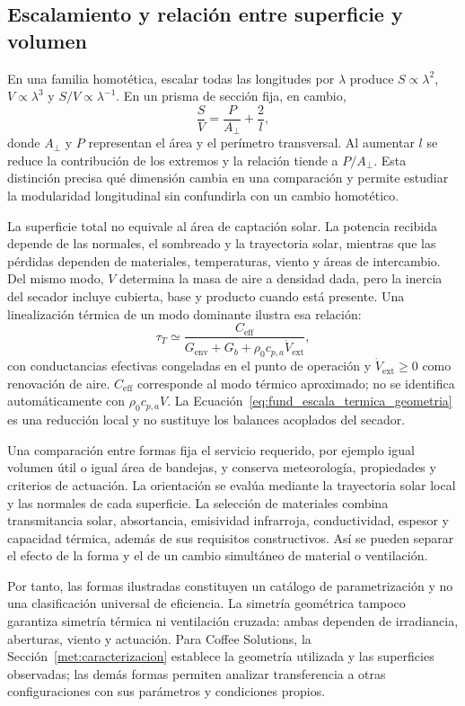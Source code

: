 \subsection{Escalamiento y relación entre superficie y volumen}
\label{subsec:geometria_escalamiento}

En una familia homotética, escalar todas las longitudes por $\lambda$ produce $S\propto\lambda^2$, $V\propto\lambda^3$ y $S/V\propto\lambda^{-1}$. En un prisma de sección fija, en cambio,
\begin{equation}
\frac{S}{V}=\frac{P}{A_{\perp}}+\frac{2}{l},
\label{eq:fund_relacion_superficie_volumen}
\end{equation}
donde $A_{\perp}$ y $P$ representan el área y el perímetro transversal. Al aumentar $l$ se reduce la contribución de los extremos y la relación tiende a $P/A_{\perp}$. Esta distinción precisa qué dimensión cambia en una comparación y permite estudiar la modularidad longitudinal sin confundirla con un cambio homotético.

La superficie total no equivale al área de captación solar. La potencia recibida depende de las normales, el sombreado y la trayectoria solar, mientras que las pérdidas dependen de materiales, temperaturas, viento y áreas de intercambio. Del mismo modo, $V$ determina la masa de aire a densidad dada, pero la inercia del secador incluye cubierta, base y producto cuando está presente. Una linealización térmica de un modo dominante ilustra esa relación:
\begin{equation}
\tau_T\simeq\frac{C_{\mathrm{eff}}}
{G_{\mathrm{env}}+G_b+\rho_0c_{p,a}\dot V_{\mathrm{ext}}},
\label{eq:fund_escala_termica_geometria}
\end{equation}
con conductancias efectivas congeladas en el punto de operación y $\dot V_{\mathrm{ext}}\geq0$ como renovación de aire. $C_{\mathrm{eff}}$ corresponde al modo térmico aproximado; no se identifica automáticamente con $\rho_0c_{p,a}V$. La Ecuación~\eqref{eq:fund_escala_termica_geometria} es una reducción local y no sustituye los balances acoplados del secador.

Una comparación entre formas fija el servicio requerido, por ejemplo igual volumen útil o igual área de bandejas, y conserva meteorología, propiedades y criterios de actuación. La orientación se evalúa mediante la trayectoria solar local y las normales de cada superficie. La selección de materiales combina transmitancia solar, absortancia, emisividad infrarroja, conductividad, espesor y capacidad térmica, además de sus requisitos constructivos. Así se pueden separar el efecto de la forma y el de un cambio simultáneo de material o ventilación.

Por tanto, las formas ilustradas constituyen un catálogo de parametrización y no una clasificación universal de eficiencia. La simetría geométrica tampoco garantiza simetría térmica ni ventilación cruzada: ambas dependen de irradiancia, aberturas, viento y actuación. Para Coffee Solutions, la Sección~\ref{met:caracterizacion} establece la geometría utilizada y las superficies observadas; las demás formas permiten analizar transferencia a otras configuraciones con sus parámetros y condiciones propios.
\FloatBarrier
